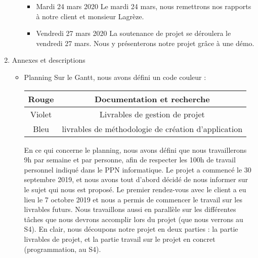 \documentclass[11pt]{report}
\begin{document}
\begin{enumerate}
\begin{itemize}
\begin{itemize}
        	    \item Mardi 24 mars 2020
        	        \newline Le mardi 24 mars, nous remettrons nos rapports à notre client et monsieur Lagrèze.
        	        
        	    \item Vendredi 27 mars 2020
        	        \newline La soutenance de projet se déroulera le vendredi 27 mars. Nous y présenterons notre projet grâce à une démo.
    	    \end{itemize}
    	\end{itemize}
\newpage
        \item Annexes et descriptions\LARGE
            \begin{itemize}\large
        	    \item Planning
        	        \newline Sur le Gantt, nous avons défini un code couleur :
            	    \newline
            	    \begin{tabular}{|c|c|}
                        \hline
                         Rouge & Documentation et recherche \\
                        \hline
                         Violet & Livrables de gestion de projet \\
                         \hline
                         Bleu & livrables de méthodologie de création d'application \\
                         \hline
                    \end{tabular}
                    \newline
                    \newline En ce qui concerne le planning, nous avons défini que nous travaillerons 9h par semaine et par personne, afin de respecter les 100h de travail personnel indiqué dans le PPN informatique.
                    \newline Le projet a commencé le 30 septembre 2019, et nous avons tout d'abord décidé de nous informer sur le sujet qui nous est proposé. Le premier rendez-vous avec le client a eu lieu le 7 octobre 2019 et nous a permis de commencer le travail sur les livrables futurs. Nous travaillons aussi en parallèle sur les différentes tâches que nous devrons accomplir lors du projet (que nous verrons au S4).
                    En clair, nous découpons notre projet en deux parties : la partie livrables de projet, et la partie travail sur le projet en concret (programmation, au S4).

\end{itemize}
\end{enumerate}
\end{document}
